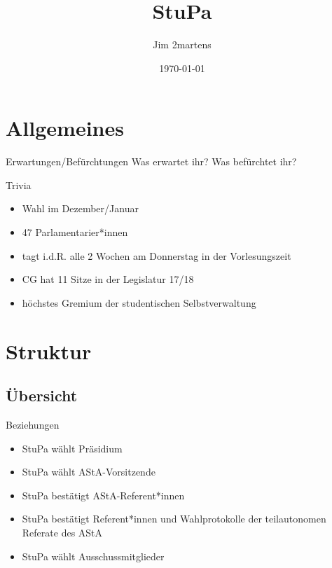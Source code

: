 \documentclass{beamer}
\begin{document}
\author{Jim 2martens}
\title{StuPa}
\date{\today}

\begin{frame}
    \titlepage
\end{frame}

\begin{frame}
    \tableofcontents
\end{frame}

\section{Allgemeines}
\begin{frame}{Erwartungen/Befürchtungen}
    \centering
    Was erwartet ihr? Was befürchtet ihr?
\end{frame}
\begin{frame}{Trivia}
    \begin{itemize}
        \item Wahl im Dezember/Januar
        \item 47 Parlamentarier*innen
        \item tagt i.d.R. alle 2 Wochen am Donnerstag in der Vorlesungszeit
        \item CG hat 11 Sitze in der Legislatur 17/18
        \item höchstes Gremium der studentischen Selbstverwaltung
    \end{itemize}
\end{frame}

\section{Struktur}
\subsection{Übersicht}

\begin{frame}{Beziehungen}
    \begin{itemize}
        \item StuPa wählt Präsidium
        \item StuPa wählt AStA-Vorsitzende
        \item StuPa bestätigt AStA-Referent*innen
        \item StuPa bestätigt Referent*innen und Wahlprotokolle der teilautonomen
              Referate des AStA
        \item StuPa wählt Ausschussmitglieder
    \end{itemize}
\end{frame}
\end{document}
